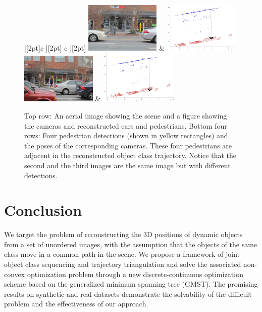 \begin{figure}
\begin{tabu}{ |[2pt]c |[2pt] c |[2pt]}
\tabucline[2pt]{-}
\includegraphics[width=0.32\textwidth]{chapter4/resource/cleanFrame085.jpg} & 
\includegraphics[width=0.32\textwidth]{chapter4/resource/Frame_085_crop.jpg} \\
\tabucline[2pt]{-}
\includegraphics[width=0.32\textwidth]{chapter4/resource/cleanFrame086.jpg} &
\includegraphics[width=0.33\textwidth]{chapter4/resource/Frame_086_crop.jpg}\\
\tabucline[2pt]{-}
\end{tabu}
\caption[Illustration of pedestrian reconstruction results.]{Top row: An aerial image showing the scene and a figure showing the cameras and reconstructed cars and pedestrians. Bottom four rows: Four pedestrian detections (shown in yellow rectangles) and the poses of the corresponding cameras. These four pedestrians are adjacent in the reconstructed object class trajectory. Notice that the second and the third images are the same image but with different detections.}
\label{fig:franklin_Recon}
\end{figure}

\section{Conclusion}
We target the problem of reconstructing the 3D positions of dynamic objects from a set of unordered images, with the assumption that the objects of the same class move in a common path in the scene. 
We propose a framework of joint object class sequencing and trajectory triangulation and solve the associated non-convex optimization problem through a new discrete-continuous optimization scheme based on the generalized minimum spanning tree (GMST).
The promising results on synthetic and real datasets demonstrate the solvability of the difficult problem and the effectiveness of our approach.


